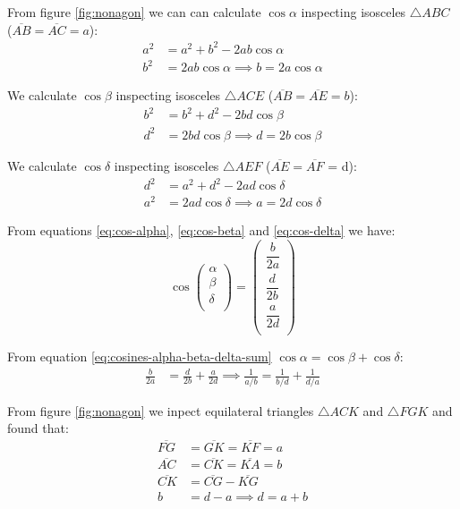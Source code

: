 \documentclass[11pt]{article}
\begin{document}
From figure \ref{fig:nonagon} we can can calculate $\cos\alpha$ inspecting 
isosceles $\triangle{ABC}$ ($\overline{AB} = \overline{AC} = a$):
\begin{align}
a^2 &= a^2 + b^2 - 2ab\cos\alpha \nonumber\\
b^2 &= 2ab\cos\alpha \implies \boxed{b = 2a\cos\alpha} \label{eq:cos-alpha}
\end{align}

We calculate $\cos\beta$ inspecting isosceles $\triangle{ACE}$
($\overline{AB} = \overline{AE} = b$):
\begin{align}
b^2 &= b^2 + d^2 - 2bd\cos\beta \nonumber\\
d^2 &= 2bd\cos\beta \implies \boxed{d = 2b\cos\beta} \label{eq:cos-beta}
\end{align}

We calculate $\cos\delta$ inspecting isosceles $\triangle{AEF}$
($\overline{AE} = \overline{AF}$ = d):
\begin{align}
d^2 &= a^2 + d^2 - 2ad\cos\delta \nonumber\\
a^2 &= 2ad\cos\delta \implies \boxed{ a = 2d\cos\delta } \label{eq:cos-delta}
\end{align}

From equations \ref{eq:cos-alpha}, \ref{eq:cos-beta} and \ref{eq:cos-delta} we have:
\begin{equation}\label{eq:cos-alpha-beta-delta}
\cos\left({\begin{array}{c} \alpha\\ \beta\\ \delta\\ \end{array}}\right)
= \left({\begin{array}{c}
\dfrac{b}{2a}\\[10pt]
\dfrac{d}{2b}\\[10pt]
\dfrac{a}{2d}\\[10pt]
\end{array}}\right)
\end{equation}

From equation \ref{eq:cosines-alpha-beta-delta-sum} $\cos\alpha = \cos\beta + \cos\delta$:
\begin{align}
\frac{b}{2a} &= \frac{d}{2b} + \frac{a}{2d}
 \implies \boxed{ \frac{1}{a/b} = \frac{1}{b/d} + \frac{1}{d/a}} \label{eq:optic}
\end{align}

From figure \ref{fig:nonagon} we inpect equilateral triangles
$\triangle{ACK}$ and $\triangle{FGK}$ and found that:
\begin{align}
\overline{FG} &= \overline{GK} = \overline{KF} = a \\
\overline{AC} &= \overline{CK} = \overline{KA} = b \\
\overline{CK} &= \overline{CG} - \overline{KG} \nonumber\\
 b &= d - a \implies \boxed{ d = a + b }
\end{align}
\end{document}
